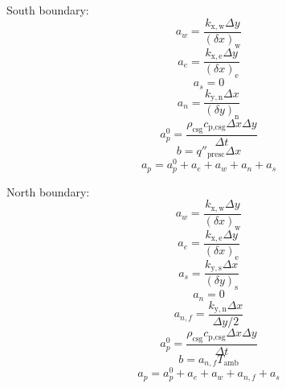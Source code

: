 \documentclass[review,preprint,12pt]{elsarticle}
\begin{document}
South boundary:
\begin{equation}
a_w = \frac{k_\mathrm{x,w}\Delta y}{(\delta x)_\mathrm{w}}  \nonumber
\end{equation}
\begin{equation}
a_e = \frac{k_\mathrm{x,e}\Delta y}{(\delta x)_\mathrm{e}} \nonumber
\end{equation}
\begin{equation}
a_s = 0 \nonumber
\end{equation}
\begin{equation}
a_n = \frac{k_\mathrm{y,n}\Delta x}{(\delta y)_\mathrm{n}} \nonumber
\end{equation}
\begin{equation}
a_p^0 = \frac{\rho_\textrm{csg} c_\textrm{p,csg} \Delta x \Delta y}{\Delta t}  \nonumber
\end{equation}
\begin{equation}
b = q''_\textrm{presc}\Delta x \nonumber
\end{equation}
\begin{equation}
a_p = a_p^0 + a_e + a_w + a_n + a_s \nonumber
\end{equation}

North boundary:
\begin{equation}
a_w = \frac{k_\mathrm{x,w}\Delta y}{(\delta x)_\mathrm{w}}  \nonumber
\end{equation}
\begin{equation}
a_e = \frac{k_\mathrm{x,e}\Delta y}{(\delta x)_\mathrm{e}} \nonumber
\end{equation}
\begin{equation}
a_s = \frac{k_\mathrm{y,s}\Delta x}{(\delta y)_\mathrm{s}} \nonumber
\end{equation}
\begin{equation}
a_n = 0 \nonumber
\end{equation}
\begin{equation}
a_{n,f} = \frac{k_\mathrm{y,n}\Delta x}{\Delta y/2} \nonumber
\end{equation}
\begin{equation}
a_p^0 = \frac{\rho_\textrm{csg} c_\textrm{p,csg} \Delta x \Delta y}{\Delta t}  \nonumber
\end{equation}
\begin{equation}
b = a_{n,f}T_\textrm{amb} \nonumber
\end{equation}
\begin{equation}
a_p = a_p^0 + a_e + a_w + a_{n,f} + a_s \nonumber
\end{equation}
\end{document}
